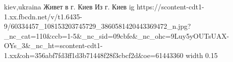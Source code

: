  
 
 
 
 

\par
kiev,ukraina
Живет в г. Киев
Из г. Киев
\ifcmt
  ig https://scontent-cdt1-1.xx.fbcdn.net/v/t1.6435-9/60334457_108153203745729_3860581420443369472_n.jpg?_nc_cat=110&ccb=1-5&_nc_sid=09cbfe&_nc_ohc=9Luy5yOUTsUAX-OYs_3&_nc_ht=scontent-cdt1-1.xx&oh=356abf7fd3ff1d3b71448f28f3cbcf2d&oe=61443360
  width 0.15
\fi

